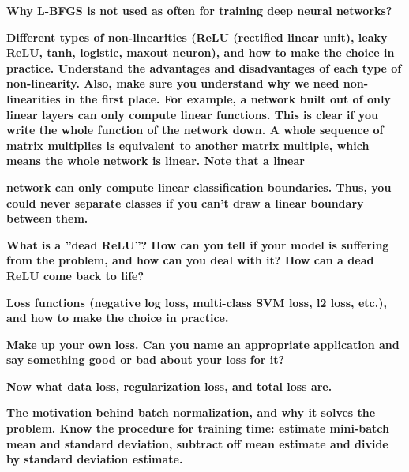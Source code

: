\documentclass[10pt,letterpaper]{article}
\begin{document}
\begin{solution}
\end{solution}
\subitem \textbf{ Why L-BFGS is not used as often for training deep neural networks?}
\begin{solution}
\end{solution}
\subitem \textbf{ Different types of non-linearities (ReLU (rectified linear unit), leaky ReLU, tanh, logistic, maxout neuron), and how to make the choice in practice. Understand the advantages and disadvantages of each type of non-linearity. Also, make sure you understand why we need non-linearities in the first place. For example, a network built out of only linear layers can only compute linear functions. This is clear if you write the whole function of the network down. A whole sequence of matrix multiplies is equivalent to another matrix multiple, which means the whole network is linear. Note that a linear}
\begin{solution}
\end{solution}
\subitem \textbf{ network can only compute linear classification boundaries. Thus, you could never separate classes if you can’t draw a linear boundary between them.}
\begin{solution}
\end{solution}
\subitem \textbf{ What is a ”dead ReLU”? How can you tell if your model is suffering from the problem, and how can you deal with it? How can a dead ReLU come back to life?}
\begin{solution}
\end{solution}
\subitem \textbf{ Loss functions (negative log loss, multi-class SVM loss, l2 loss, etc.), and how to make the choice in practice.}
\begin{solution}
\end{solution}
\subitem \textbf{ Make up your own loss. Can you name an appropriate application and say something good or bad about your loss for it?}
\begin{solution}
\end{solution}
\subitem \textbf{ Now what data loss, regularization loss, and total loss are.}
\begin{solution}
\end{solution}
\subitem \textbf{ The motivation behind batch normalization, and why it solves the problem. Know the procedure for training time: estimate mini-batch mean and standard deviation, subtract off mean estimate and divide by standard deviation estimate.}
\begin{solution}
\end{solution}
\end{document}
